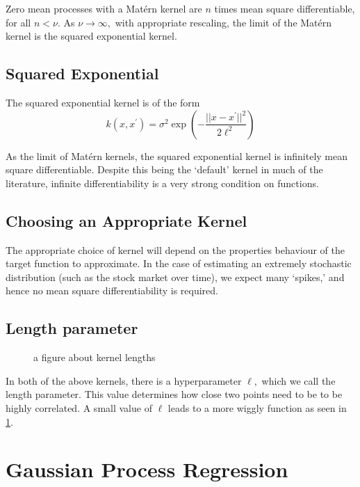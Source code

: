 Zero mean processes with a Mat\'ern kernel are $n$ times mean square
differentiable, for all $n < \nu.$ As $\nu\to\infty,$ with appropriate
rescaling, the limit of the Mat\'ern kernel is the squared exponential
kernel.\cite[85]{rasmussen_gaussian_2008}

\subsection*{Squared Exponential}

The squared exponential kernel is of the form
$$
    k(x, x^\prime)
    = \sigma^2\exp\left(-\frac{||x - x^\prime||^2}{2\ell^2}\right)
$$

As the limit of Mat\'ern kernels, the squared exponential kernel is infinitely
mean square differentiable. Despite this being the `default' kernel in much of
the literature, infinite differentiability is a very strong condition on
functions.

\subsection*{Choosing an Appropriate Kernel}

The appropriate choice of kernel will depend on the properties behaviour of the
target function to approximate. In the case of estimating an extremely 
stochastic distribution (such as the stock market over time), we expect many
`spikes,' and hence no mean square differentiability is required.

\subsection*{Length parameter}

\begin{figure}
    \caption{a figure about kernel lengths}
    \label{fig:no_reg_lengths}
\end{figure}

In both of the above kernels, there is a hyperparameter $\ell,$ which we call
the length parameter. This value determines how close two points need to be to
be highly correlated. A small value of $\ell$ leads to a more wiggly function
as seen in \ref{fig:no_reg_lengths}.

\section{Gaussian Process Regression}

